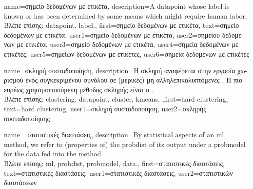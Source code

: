 {name={\foreignlanguage{greek}{σημείο δεδομένων με ετικέτα}},
 	description={A \gls{datapoint} whose \gls{label} is known or has been determined 
 		by some means which might require human labor.\\
	\foreignlanguage{greek}{Βλέπε επίσης:} \gls{datapoint}, \gls{label}.},
 first={\foreignlanguage{greek}{σημείο δεδομένων με ετικέτα}},
 text={\foreignlanguage{greek}{σημείο δεδομένων με ετικέτα}},
 user1={\foreignlanguage{greek}{σημείο δεδομένων με ετικέτα}}, %
 user2={\foreignlanguage{greek}{σημείου δεδομένων με ετικέτα}}, %
 user3={\foreignlanguage{greek}{σημείο δεδομένων με ετικέτα}}, %
 user4={\foreignlanguage{greek}{σημεία δεδομένων με ετικέτες}}, %
 user5={\foreignlanguage{greek}{σημείων δεδομένων με ετικέτες}}, %
 user6={\foreignlanguage{greek}{σημεία δεδομένων με ετικέτες}} %
}

{name={\foreignlanguage{greek}{σκληρή συσταδοποίηση}}, 
	description={\foreignlanguage{greek}{Η σκληρή} 
		\foreignlanguage{greek}{αναφέρεται στην εργασία χωρισμού ενός συγκεκριμένου συνόλου}  
		\foreignlanguage{greek}{σε (μερικές) μη αλληλεπικαλυπτόμενες} . 
		\foreignlanguage{greek}{Η πιο ευρέως χρησιμοποιούμενη μέθοδος σκληρής}  \foreignlanguage{greek}{είναι ο} 
		.\\
	\foreignlanguage{greek}{Βλέπε επίσης:} \gls{clustering}, \gls{datapoint}, \gls{cluster}, \gls{kmeans}.
	},first={hard clustering},
	text={hard clustering},
	user1={\foreignlanguage{greek}{σκληρή συσταδοποίηση}}, %
	user2={\foreignlanguage{greek}{σκληρής συσταδοποίησης}} %
}

{name ={\foreignlanguage{greek}{στατιστικές διαστάσεις}}, 
	description={By statistical aspects 
		of an \gls{ml} method, we refer to (properties of) the \gls{probdist} of its output 
		under a \gls{probmodel} for the \gls{data} fed into the method.\\
		\foreignlanguage{greek}{Βλέπε επίσης:} \gls{ml}, \gls{probdist}, \gls{probmodel}, \gls{data}.},
		first={\foreignlanguage{greek}{στατιστικές διαστάσεις}},
		text={\foreignlanguage{greek}{στατιστικές διαστάσεις}},
		user1={\foreignlanguage{greek}{στατιστικές διαστάσεις}}, %
		user2={\foreignlanguage{greek}{στατιστικών διαστάσεων}} %
}

